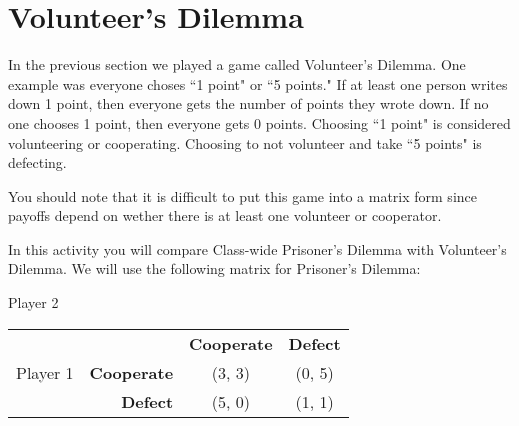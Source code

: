 
\section{Volunteer's Dilemma}



\vspace{.1in}
In the previous section we played a game called Volunteer's Dilemma. One example was everyone choses ``1 point" or ``5 points." If at least one person writes down 1 point, then everyone gets the number of points they wrote down. If no one chooses 1 point, then everyone gets 0 points. Choosing ``1 point" is considered volunteering or cooperating. Choosing to not volunteer and take ``5 points" is defecting.

You should note that it is difficult to put this game into a matrix form since payoffs depend on wether there is at least one volunteer or cooperator. 

In this activity you will compare Class-wide Prisoner's Dilemma with Volunteer's Dilemma. We will use the following matrix for Prisoner's Dilemma:

\hspace{3in}Player 2

\begin{center}
\begin{tabular}{l|r|c|c|}\cline{2-4}
&&\textbf{Cooperate}&\textbf{Defect}\\ \cline{2-4}
Player 1&\textbf{Cooperate} &(3, 3)&(0, 5)\\ \cline{2-4}
&\textbf{Defect} &(5, 0)&(1, 1)\\ \cline{2-4}
\end{tabular}
\end{center}
\vspace{.1in}



